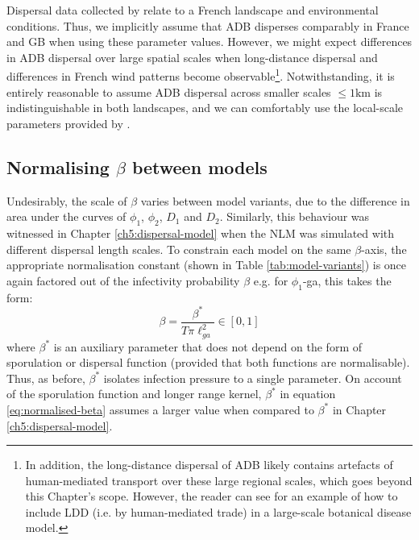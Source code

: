 Dispersal data collected by \cite{grosdidier2018tracking} relate to a French landscape and environmental conditions.
Thus, we implicitly assume that ADB disperses comparably in France and GB when using these parameter values. However, we might expect differences in ADB dispersal over large spatial scales when long-distance dispersal and differences in French wind patterns become observable\footnote{In addition, the long-distance dispersal of ADB likely contains artefacts of human-mediated transport over these large regional scales, which goes beyond this Chapter's scope. However, the reader can see \cite{harwood2009epidemiological} for an example of how to include LDD (i.e. by human-mediated trade) in a large-scale botanical disease model.}. 
Notwithstanding, it is entirely reasonable to assume ADB dispersal across smaller scales $\leq 1\mathrm{km}$ is indistinguishable in both landscapes, and we can comfortably use the local-scale parameters provided by \cite{grosdidier2018tracking}.

\subsection{Normalising $\beta$ between models}

Undesirably, the scale of $\beta$ varies between model variants, due to the difference in area under the curves of $\phi_1$, $\phi_2$, $D_1$ and $D_2$.
Similarly, this behaviour was witnessed in Chapter \ref{ch5:dispersal-model} when the NLM was simulated with different dispersal length scales.
To constrain each model on the same $\beta$-axis, the appropriate normalisation constant (shown in Table \ref{tab:model-variants}) is once again factored out of the infectivity probability $\beta$ 
e.g. for $\phi_1$-ga, this takes the form: 
\begin{equation}
    \beta = \frac{\beta^*}{T \pi \ell^2_{ga}} \in [0, 1]
\label{eq:normalised-beta}
\end{equation}
where $\beta^*$ is an auxiliary parameter that does not depend on the form of sporulation or dispersal function (provided that both functions are normalisable).
Thus, as before, $\beta^*$ isolates infection pressure to a single parameter.
On account of the sporulation function and longer range kernel, $\beta^*$ in equation \ref{eq:normalised-beta} assumes a larger value when compared to $\beta^*$ in Chapter \ref{ch5:dispersal-model}.


